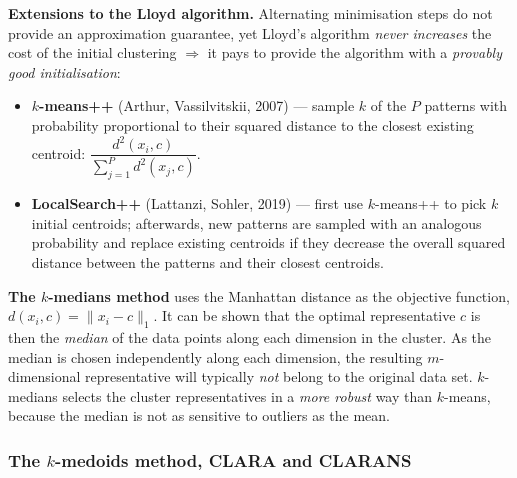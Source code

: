 \documentclass[11pt,a4paper]{article}
\theoremstyle{definition}
\begin{document}
\textbf{Extensions to the Lloyd algorithm.} Alternating minimisation steps do not provide an
approximation guarantee, yet Lloyd's algorithm \emph{never increases} the cost of the initial
clustering $\Rightarrow$ it pays to provide the algorithm with a \emph{provably good
initialisation}:
\begin{itemize}
\item \textbf{$k$-means++} (Arthur, Vassilvitskii, 2007) --- sample $k$ of the $P$ patterns with
      probability proportional to their squared distance to the closest existing centroid:
      $\dfrac{d^2(x_i,c)}{\sum_{j=1}^{P}d^2(x_j,c)}$.
\item \textbf{LocalSearch++} (Lattanzi, Sohler, 2019) --- first use $k$-means++ to pick $k$
      initial centroids; afterwards, new patterns are sampled with an analogous probability and
      replace existing centroids if they decrease the overall squared distance between the
      patterns and their closest centroids.
\end{itemize}

\textbf{The $k$-medians method} uses the Manhattan distance as the objective function,
$d(x_i,c)=\|x_i-c\|_1$. It can be shown that the optimal representative $c$ is then the
\emph{median} of the data points along each dimension in the cluster. As the median is chosen
independently along each dimension, the resulting $m$-dimensional representative will typically
\emph{not} belong to the original data set. $k$-medians selects the cluster representatives in a
\emph{more robust} way than $k$-means, because the median is not as sensitive to outliers as the
mean.

\subsubsection{The $k$-medoids method, CLARA and CLARANS}
\end{document}
